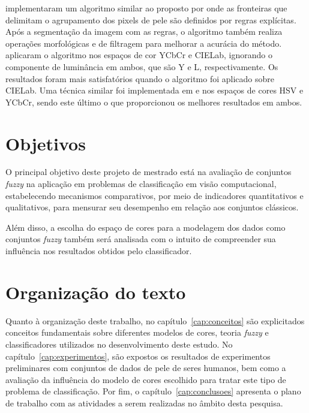 \citet{kaur:12} implementaram um algoritmo similar ao proposto por \citet{kovac:03} onde as fronteiras que delimitam o agrupamento dos pixels de pele são definidos por regras explícitas. Após a segmentação da imagem com as regras, o algoritmo também realiza operações morfológicas e de filtragem para melhorar a acurácia do método. \citet{kaur:12} aplicaram o algoritmo nos espaços de cor YCbCr e CIELab, ignorando o componente de luminância em ambos, que são Y e L, respectivamente. Os resultados foram mais satisfatórios quando o algoritmo foi aplicado sobre CIELab. Uma técnica similar foi implementada em \citet{shaik:15} e \citet{kumar:15} nos espaços de cores HSV e YCbCr, sendo este último o que proporcionou os melhores resultados em ambos.


\section{Objetivos}
\label{sec:objetivo}

O principal objetivo deste projeto de mestrado está na avaliação de conjuntos \emph{fuzzy} na aplicação em problemas de classificação em visão computacional, estabelecendo mecanismos comparativos, por meio de indicadores quantitativos e qualitativos, para mensurar seu desempenho em relação aos conjuntos clássicos.

Além disso, a escolha do espaço de cores para a modelagem dos dados como conjuntos \emph{fuzzy} também será analisada com o intuito de compreender sua influência nos resultados obtidos pelo classificador.


\section{Organização do texto}
\label{sec:organizacao_trabalho}

Quanto à organização deste trabalho, no capítulo~\ref{cap:conceitos} são explicitados conceitos fundamentais sobre diferentes modelos de cores, teoria \emph{fuzzy} e classificadores utilizados no desenvolvimento deste estudo. No capítulo~\ref{cap:experimentos}, são expostos os resultados de experimentos preliminares com conjuntos de dados de pele de seres humanos, bem como a avaliação da influência do modelo de cores escolhido para tratar este tipo de problema de classificação. Por fim, o capítulo~\ref{cap:conclusoes} apresenta o plano de trabalho com as atividades a serem realizadas no âmbito desta pesquisa.

